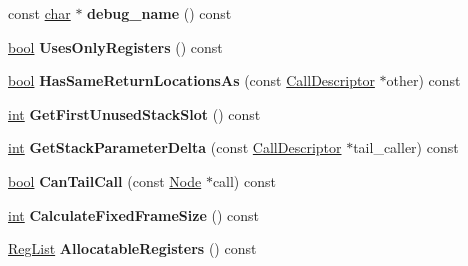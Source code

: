 \begin{DoxyCompactItemize}
const \mbox{\hyperlink{classchar}{char}} $\ast$ {\bfseries debug\+\_\+name} () const
\item 
\mbox{\label{classv8_1_1internal_1_1compiler_1_1CallDescriptor_a69b21da5272b8a31912799fd9954c9a9}} 
\mbox{\hyperlink{classbool}{bool}} {\bfseries Uses\+Only\+Registers} () const
\item 
\mbox{\label{classv8_1_1internal_1_1compiler_1_1CallDescriptor_a05bbc3a858520aa38f4f5b3cce51bb6f}} 
\mbox{\hyperlink{classbool}{bool}} {\bfseries Has\+Same\+Return\+Locations\+As} (const \mbox{\hyperlink{classv8_1_1internal_1_1compiler_1_1CallDescriptor}{Call\+Descriptor}} $\ast$other) const
\item 
\mbox{\label{classv8_1_1internal_1_1compiler_1_1CallDescriptor_aa7f80957828f565072951669159df592}} 
\mbox{\hyperlink{classint}{int}} {\bfseries Get\+First\+Unused\+Stack\+Slot} () const
\item 
\mbox{\label{classv8_1_1internal_1_1compiler_1_1CallDescriptor_ab7ab55536e454c9ad6d89ed94e469d3c}} 
\mbox{\hyperlink{classint}{int}} {\bfseries Get\+Stack\+Parameter\+Delta} (const \mbox{\hyperlink{classv8_1_1internal_1_1compiler_1_1CallDescriptor}{Call\+Descriptor}} $\ast$tail\+\_\+caller) const
\item 
\mbox{\label{classv8_1_1internal_1_1compiler_1_1CallDescriptor_a578b7485ea2ffe3fba99457ab08267c8}} 
\mbox{\hyperlink{classbool}{bool}} {\bfseries Can\+Tail\+Call} (const \mbox{\hyperlink{classv8_1_1internal_1_1compiler_1_1Node}{Node}} $\ast$call) const
\item 
\mbox{\label{classv8_1_1internal_1_1compiler_1_1CallDescriptor_a2ba966a9622d88c175ba0edb6dfa480c}} 
\mbox{\hyperlink{classint}{int}} {\bfseries Calculate\+Fixed\+Frame\+Size} () const
\item 
\mbox{\label{classv8_1_1internal_1_1compiler_1_1CallDescriptor_a488be962eff206fc1b2e4ff343cac468}} 
\mbox{\hyperlink{classuint32__t}{Reg\+List}} {\bfseries Allocatable\+Registers} () const

\end{DoxyCompactItemize}
